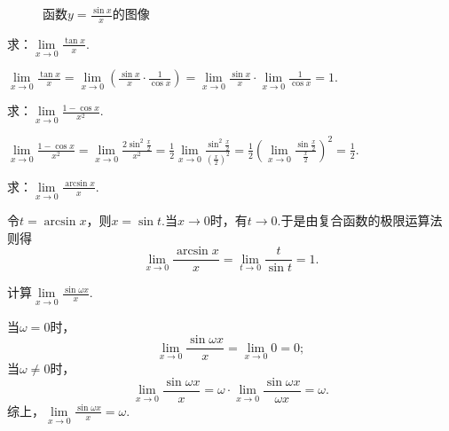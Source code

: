 \begin{figure}[ht]
	\centering
	\caption{函数\(y=\frac{\sin x}{x}\)的图像}
\end{figure}

\begin{example}
\def\l{\lim\limits_{x\to0}}
求：\(\l \frac{\tan x}{x}\).
\begin{solution}
\(
\l \frac{\tan x}{x}
= \l \left(\frac{\sin x}{x} \cdot \frac{1}{\cos x}\right)
= \l \frac{\sin x}{x} \cdot \lim\limits_{x\to0}\frac{1}{\cos x}
= 1.
\)
\end{solution}
\end{example}

\begin{example}
\def\l{\lim\limits_{x\to0}}
求：\(\l \frac{1 - \cos x}{x^2}\).
\begin{solution}
\(
\l \frac{1 - \cos x}{x^2}
= \l \frac{2 \sin^2\frac{x}{2}}{x^2}
= \frac{1}{2} \l \frac{\sin^2\frac{x}{2}}{\left(\frac{x}{2}\right)^2}
= \frac{1}{2} \left(\l \frac{\sin \frac{x}{2}}{\frac{x}{2}}\right)^2
= \frac{1}{2}.
\)
\end{solution}
\end{example}

\begin{example}
求：\(\lim\limits_{x\to0}\frac{\arcsin x}{x}\).
\begin{solution}
令\(t = \arcsin x\)，则\(x = \sin t\).当\(x\to0\)时，有\(t\to0\).于是由复合函数的极限运算法则得\[
\lim\limits_{x\to0}\frac{\arcsin x}{x}
= \lim\limits_{t\to0}\frac{t}{\sin t}
= 1.
\]
\end{solution}
\end{example}

\begin{example}
\def\l{\lim\limits_{x\to0}}
计算\(\l \frac{\sin \omega x}{x}\).
\begin{solution}
当\(\omega=0\)时，\[
\l \frac{\sin \omega x}{x} = \l 0 = 0;
\]当\(\omega\neq0\)时，\[
\l \frac{\sin \omega x}{x}
= \omega \cdot \l \frac{\sin \omega x}{\omega x}
= \omega.
\]综上，\(\l \frac{\sin \omega x}{x} = \omega\).
\end{solution}
\end{example}

